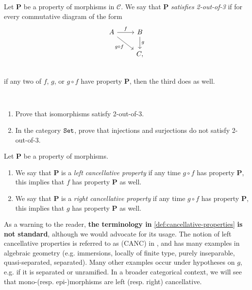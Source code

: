 \begin{definition}\label{def:2-out-of-3} Let \textbf{P} be a property of morphisms in $\mathscr{C}$. We say that \textbf{P} \textit{satisfies 2-out-of-3} if for every commutative diagram of the form
\[ \begin{tikzcd}
    A\rar["f" above]\ar[dr,"g\circ f" below left] & B\dar["g" right]\\
     & C,\\
\end{tikzcd} \]
if any two of $f$, $g$, or $g\circ f$ have property \textbf{P}, then the third does as well.
\end{definition}


\begin{exercise} $\ $
\begin{enumerate}
    \item Prove that isomorphisms satisfy 2-out-of-3.
    \item In the category $\texttt{Set}$, prove that injections and surjections do not satisfy 2-out-of-3.
\end{enumerate}
\end{exercise}

\begin{definition}\label{def:cancellative-properties} Let \textbf{P} be a property of morphisms.
\begin{enumerate}
    \item We say that \textbf{P} is a \textit{left cancellative property} if any time $g\circ f$ has property \textbf{P}, this implies that $f$ has property \textbf{P} as well.
    \item We say that \textbf{P} is a \textit{right cancellative property} if any time $g\circ f$ has property \textbf{P}, this implies that $g$ has property \textbf{P} as well.
\end{enumerate}
\end{definition}
As a warning to the reader, \textbf{the terminology in} \autoref{def:cancellative-properties} \textbf{is not standard}, although we would advocate for its usage. The notion of left cancellative properties is referred to as (CANC) in \cite[Appendix~C]{GortzWedhorn}, and has many examples in algebraic geometry (e.g. immersions, locally of finite type, purely inseparable, quasi-separated, separated). Many other examples occur under hypotheses on $g$, e.g. if it is separated or unramified. In a broader categorical context, we will see that mono-(resp. epi-)morphisms are left (resp. right) cancellative. 


